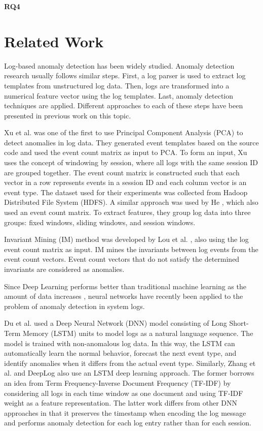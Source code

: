 \textbf{RQ4} \textit{\RQFourth}\\ 
    


\section{Related Work}
Log-based anomaly detection has been widely studied. Anomaly detection research usually follows similar steps. First, a log parser is used to extract log templates from unstructured log data. Then, logs are transformed into a numerical feature vector using the log templates. Last, anomaly detection techniques are applied.
Different approaches to each of these steps have been presented in previous work on this topic. 

Xu et al. \cite{xu2009} was one of the first to use Principal Component Analysis (PCA) to detect anomalies in log data. They generated event templates based on the source code and used the event count matrix as input to PCA. To form an input, Xu uses the concept of windowing by session, where all logs with the same session ID are grouped together. The event count matrix is constructed such that each vector in a row represents events in a session ID and each column vector is an event type. The dataset used for their experiments was collected from Hadoop Distributed File System (HDFS).
A similar approach was used by He \cite{he2016}, which also used an event count matrix. To extract features, they group log data into three groups: fixed windows, sliding windows, and session windows. 

Invariant Mining (IM) method was developed by Lou et al. \cite{lou2010}, also using the log event count matrix as input. IM mines the invariants between log events from the event count vectors. Event count vectors that do not satisfy the determined invariants are considered as anomalies. 

Since Deep Learning performs better than traditional machine learning as the amount of data increases \cite{Sydney2019DeepLF}, neural networks have recently been applied to the problem of anomaly detection in system logs. 

Du et al. \cite{deeplog2017} used a Deep Neural Network (DNN) model consisting of Long Short-Term Memory (LSTM) units to model logs as a natural language sequence. The model is trained with non-anomalous log data. In this way, the LSTM can automatically learn the normal behavior, forecast the next event type, and identify anomalies when it differs from the actual event type. Similarly, Zhang et al. \cite{zhang2016} and DeepLog \cite{deeplog2017} also use an LSTM deep learning approach. The former borrows an idea from Term Frequency-Inverse Document Frequency (TF-IDF) by considering all logs in each time window as one document and using TF-IDF weight as a feature representation. The latter work differs from other DNN approaches in that it preserves the timestamp when encoding the log message and performs anomaly detection for each log entry rather than for each session.

